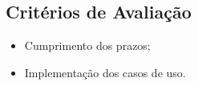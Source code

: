 \begin{apendicesenv}
\section{Critérios de Avaliação}
\begin{itemize}
\item Cumprimento dos prazos;
\item Implementação dos casos de uso.
\end{itemize}















\end{apendicesenv}
